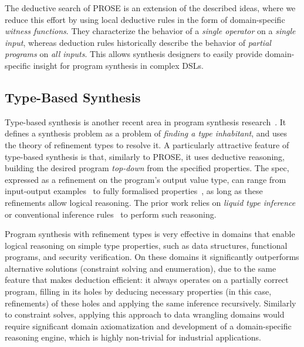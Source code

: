 The deductive search of PROSE is an extension of the described ideas, where we reduce this effort by using local
deductive rules in the form of domain\hyp{}specific \emph{witness functions}.
They characterize the behavior of a \emph{single operator} on a \emph{single input}, whereas deduction rules
historically describe the behavior of \emph{partial programs} on \emph{all inputs}.
This allows synthesis designers to easily provide domain\hyp{}specific insight for program synthesis in complex DSLs.

\subsection{Type-Based Synthesis}

Type-based synthesis is another recent area in program synthesis research~\cite{popl16:frankle,polikarpova2016program}.
It defines a synthesis problem as a problem of \emph{finding a type inhabitant}, and uses the theory of refinement types
to resolve it.
A particularly attractive feature of type-based synthesis is that, similarly to PROSE, it uses
deductive reasoning, building the desired program \emph{top-down} from the specified properties.
The spec, expressed as a refinement on the program's output value type, can range from input-output
examples~\cite{popl16:frankle} to fully formalised properties~\cite{polikarpova2016program}, as long as these
refinements allow logical reasoning.
The prior work relies on \emph{liquid type inference}~\cite{rondon2008liquid} or conventional inference
rules~\cite{pldi15:osera} to perform such reasoning.

Program synthesis with refinement types is very effective in domains that enable logical reasoning on simple type
properties, such as data structures, functional programs, and security verification.
On these domains it significantly outperforms alternative solutions (constraint solving and enumeration), due to the
same feature that makes deduction efficient: it always operates on a partially correct program, filling in its holes by
deducing necessary properties (in this case, refinements) of these holes and applying the same inference recursively.
Similarly to constraint solves, applying this approach to data wrangling domains would require significant domain
axiomatization and development of a domain-specific reasoning engine, which is highly non-trivial for industrial
applications.

